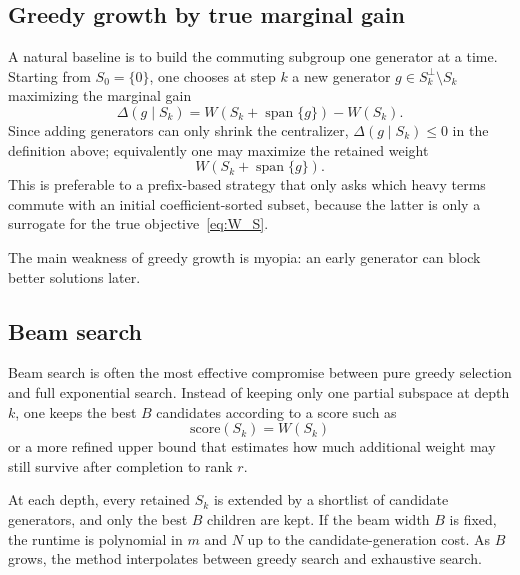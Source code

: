 \documentclass[11pt]{article}
\begin{document}
\subsection{Greedy growth by true marginal gain}
A natural baseline is to build the commuting subgroup one generator at a time. Starting from $S_0=\{0\}$, one chooses at step $k$ a new generator $g\in S_k^{\perp}\setminus S_k$ maximizing the marginal gain
\begin{equation}
  \Delta(g\mid S_k) = W(S_k+\operatorname{span}\{g\}) - W(S_k).
\end{equation}
Since adding generators can only shrink the centralizer, $\Delta(g\mid S_k)\le 0$ in the definition above; equivalently one may maximize the retained weight
\begin{equation}
  W(S_k+\operatorname{span}\{g\}).
\end{equation}
This is preferable to a prefix-based strategy that only asks which heavy terms commute with an initial coefficient-sorted subset, because the latter is only a surrogate for the true objective~\eqref{eq:W_S}.

The main weakness of greedy growth is myopia: an early generator can block better solutions later.

\subsection{Beam search}
Beam search is often the most effective compromise between pure greedy selection and full exponential search. Instead of keeping only one partial subspace at depth $k$, one keeps the best $B$ candidates according to a score such as
\begin{equation}
  \mathrm{score}(S_k)=W(S_k)
\end{equation}
or a more refined upper bound that estimates how much additional weight may still survive after completion to rank $r$.

At each depth, every retained $S_k$ is extended by a shortlist of candidate generators, and only the best $B$ children are kept. If the beam width $B$ is fixed, the runtime is polynomial in $m$ and $N$ up to the candidate-generation cost. As $B$ grows, the method interpolates between greedy search and exhaustive search.
\end{document}
